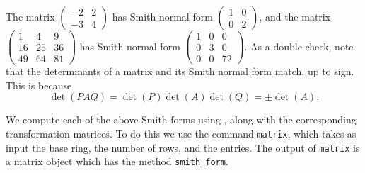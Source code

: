 \begin{example}
The matrix $\begin{pmatrix} -2 & 2 \\ -3 & 4 \end{pmatrix}$ has Smith normal form
$\begin{pmatrix} 1 & 0 \\ 0 & 2 \end{pmatrix}$,
and the matrix
$\begin{pmatrix} 1 & 4 & 9 \\ 16 & 25 & 36 \\ 49 & 64 & 81 \end{pmatrix}$
has Smith normal form
$\begin{pmatrix} 1 & 0 & 0 \\ 0 & 3 & 0 \\ 0 & 0 & 72 \end{pmatrix}$.
As a double check, note that the determinants of a matrix and its
Smith normal form match, up to sign. This is because
\[
  \det(PAQ) = \det(P)\det(A)\det(Q) = \pm \det(A).
\]

We compute each of the above Smith forms using {\Sage},
along with the corresponding transformation matrices.
To do this we use the {\Sage} command {\tt matrix},
which takes as input the base ring, the number
of rows, and the entries. The output of {\tt matrix}
is a matrix object which has the method {\tt smith\_form}.


\end{example}
